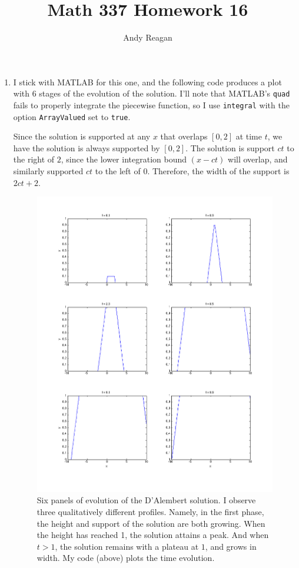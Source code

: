 \documentclass[11pt]{article}
\author{Andy Reagan}
\title{Math 337 Homework 16}
\begin{document}
\maketitle

\begin{enumerate}

\item I stick with MATLAB for this one, and the following code produces a plot with 6 stages of the evolution of the solution.
I'll note that MATLAB's \verb|quad| fails to properly integrate the piecewise function, so I use \verb|integral| with the option \verb|ArrayValued| set to \verb|true|.

Since the solution is supported at any $x$ that overlaps $[0,2]$ at time $t$, we have the solution is always supported by $[0,2]$.
The solution is support $ct$ to the right of $2$, since the lower integration bound $(x-ct)$ will overlap, and similarly supported $ct$ to the left of 0.
Therefore, the width of the support is $2ct+2$.



\begin{figure}[h!]
  \centering
    \includegraphics[width=1.05\textwidth]{andy_hw16_prb01_03.png}
   \caption{Six panels of evolution of the D'Alembert solution.
   I observe three qualitatively different profiles.
   Namely, in the first phase, the height and support of the solution are both growing.
   When the height has reached 1, the solution attains a peak.
   And when $t>1$, the solution remains with a plateau at $1$, and grows in width.
   My code (above) plots the time evolution.}
\end{figure}


\end{enumerate}
\end{document}
